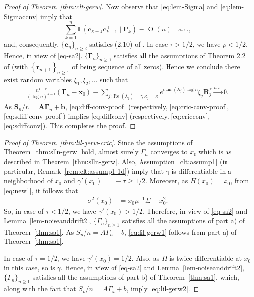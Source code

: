 \documentclass[12pt]{amsart}
\theoremstyle{plain}
\theoremstyle{remark}
\numberwithin{equation}{section}
\begin{document}
\begin{proof}[Proof of Theorem~\ref{thm:clt-gerw}]
Now observe that \eqref{eq:lem-Sigma} and \eqref{eq:lem-Sigmaconv} imply that 
\[
       \sum_{k=1}^{n}\mathbb{E}\left(\boldsymbol{e}_{k+1}\boldsymbol{e}^{\top}_{k+1} \mid \boldsymbol{\Gamma}_{k}\right) = \operatorname{O}\left(n\right) \quad \text{a.s.},
    \]
and, consequently, $\{\boldsymbol{e}_{n}\}_{n\geq2}$ satisfies (2.10) of \cite{zhang2016central}. In case $\tau > 1/2$,  we have $\rho < 1/2$. Hence, in view of \eqref{eq-sa2}, $\{\boldsymbol{\Gamma}_n\}_{n \geq 1}$ satisfies all the assumptions of Theorem 2.2 of \cite{zhang2016central} (with $\left\{\boldsymbol{r}_{n+1}\right\}_{n \geq 1}$ of \cite{zhang2016central} being sequence of all zeros). Hence we conclude there exist random variables ${\xi}_1, {\xi}_2, \ldots$ such that
\begin{align}\label{eq:sdiff-conv-proof}
    \frac{n^{1-\tau}}{(\log n)^{\kappa - 1}}\left(\boldsymbol{\Gamma}_{n} - \boldsymbol{x}_0\right) - \sum_{j : \operatorname{Re}\left(\lambda_j\right) = \tau, \kappa_j = \kappa}e^{\iota\operatorname{Im}\left(\lambda_j\right)\log n}{\xi}_j\boldsymbol{R}^*_{j} \stackrel{a.s.}{\to} 0. %
\end{align}
As ${\boldsymbol{S}_n}/{n} = \boldsymbol{A}\boldsymbol{\Gamma}_{n} + \boldsymbol{b}$, \eqref{eq:diff-conv-proof} (respectively, \eqref{eq:cric-conv-proof}, \eqref{eq:sdiff-conv-proof}) implies \eqref{eq:diffconv} (respectively, \eqref{eq:cricconv}, \eqref{eq:sdiffconv}). This completes the proof.
\end{proof}


\begin{proof}[{Proof of Theorem~\ref{thm:lil-gerw-cric}}] Since the assumptions of Theorem~\ref{thm:slln-gerw} hold, almost surely ${\Gamma}_{n}$ converges to ${x}_0$ which is as described in Theorem~\ref{thm:slln-gerw}. Also, Assumption~\ref{clt:assump1} (in particular, Remark~\ref{rem:clt:assump1-1d}) imply that ${\gamma}$ is differentiable in a neighborhood of ${x}_0$ and ${\gamma}'({x}_0) = 1 - \tau \geq 1/2$. Moreover, as $H(x_0) = x_0$, from \eqref{eq:new1},%
it follows that
\begin{align}\label{eq:sigma-proof}
    \sigma^2\left({x}_0\right) &= %
    x_0\mu^{-1}\Sigma - x_0^2. %
\end{align} So, in case of $\tau < 1/2$, we have ${\gamma}'({x}_0) > 1/2$. Therefore, in view of \eqref{eq-sa2} and Lemma~\ref{lem-noiseanddrift2}, %
$\{{\Gamma}_n\}_{n \geq 1}$ satisfies all the assumptions of part a) of Theorem~\ref{thm:sa1}. As ${{S}_n}/{n} = {A}{\Gamma}_{n} + {b}$, \eqref{eq:lil-gerw1} follows from part a) of Theorem~\ref{thm:sa1}.

In case of $\tau = 1/2$, we have ${\gamma}'({x}_0) = 1/2$. Also, as ${H}$ is twice differentiable at ${x}_0$ in this case, so is $\gamma$. Hence, in view of \eqref{eq-sa2} and Lemma~\ref{lem-noiseanddrift2}, %
$\{{\Gamma}_n\}_{n \geq 1}$ satisfies all the assumptions of part b) of Theorem~\ref{thm:sa1}, which, along with the fact that ${{S}_n}/{n} = {A}{\Gamma}_{n} + {b}$, imply \eqref{eq:lil-gerw2}.
\end{proof}
\end{document}
